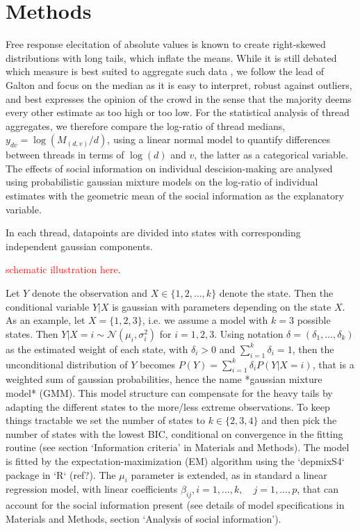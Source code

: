 \documentclass[9pt,twocolumn,twoside,lineno]{pnas-new}
\begin{document}
\section*{Methods}
Free response elecitation of absolute values is known to create right-skewed distributions with long tails, which inflate the means. While it is still debated which measure is best suited to aggregate such data \cite{kao2018counteracting}, we follow the lead of Galton \cite{galton1907vox} and focus on the median as it is easy to interpret, robust against outliers, and best expresses the opinion of the crowd in the sense that the majority deems every other estimate as too high or too low. For the statistical analysis of thread aggregates, we therefore compare the log-ratio of thread medians, $y_{dv}=\log(M_{(d,v)}/d)$, using a linear normal model to quantify differences between threads in terms of $\log(d)$ and $v$, the latter as a categorical variable. The effects of social information on individual descision-making are analysed using probabilistic gaussian mixture models on the log-ratio of individual estimates with the geometric mean of the social information as the explanatory variable. 

In each thread, datapoints are divided into states with corresponding independent gaussian components. 

\textcolor{red}{schematic illustration here}. 

Let $Y$ denote the observation and $X\in\{1,2,\dots,k\}$ denote the state. Then the conditional variable $Y|X$ is gaussian with parameters depending on the state $X$. As an example, let $X=\{1,2,3\}$, i.e. we assume a model with $k=3$ possible states. Then $Y|X=i \sim \mathcal{N}(\mu_i,\sigma_i^2)$ for $i=1,2,3$. Using notation $\delta = (\delta_1,\dots,\delta_k)$ as the estimated weight of each state, with $\delta_i >0$ and $\sum_{i=1}^k\delta_i = 1$, then the unconditional distribution of $Y$ becomes $P(Y) = \sum_{i=1}^k \delta_i P(Y|X=i)$, that is a weighted sum of gaussian probabilities, hence the name *gaussian mixture model* (GMM). This model structure can compensate for the heavy tails by adapting the different states to the more/less extreme observations.  To keep things tractable we set the number of states to $k\in\{2,3,4\}$ and then pick the number of states with the lowest BIC, conditional on convergence in the fitting routine (see section `Information criteria' in Materials and Methods). The model is fitted by the expectation-maximization (EM) algorithm using the `depmixS4` package in `R` (ref?). The $\mu_i$ parameter is extended, as in standard a linear regression model, with linear coefficients $\beta_{ij}, i=1,\dots,k, \quad j=1,\dots,p$, that can account for the social information present (see details of model specifications in Materials and Methods, section `Analysis of social information').
\end{document}
